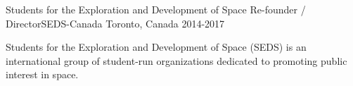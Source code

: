 \begin{cventries}
  \cventry
    {Students for the Exploration and Development of Space} %
    {Re-founder / Director{\enskip\cdotp\enskip}SEDS-Canada} %
    {Toronto, Canada} %
    {2014-2017} %
    {
      \begin{cvitems} %
        \item {Students for the Exploration and Development of Space (SEDS) is an international group of student-run organizations dedicated to promoting public interest in space.}
      \end{cvitems}
    }
\end{cventries}
